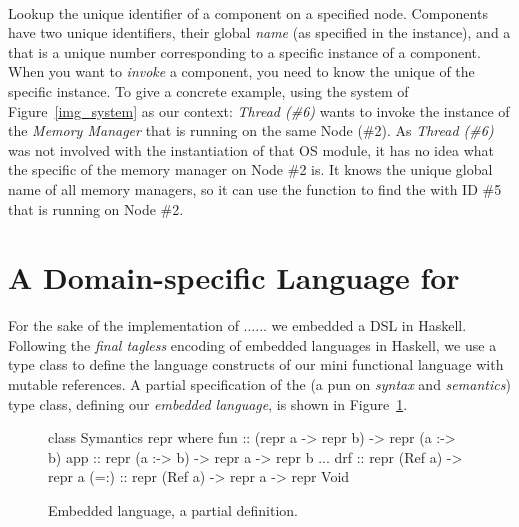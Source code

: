 \paragraph{}
Lookup the unique identifier of a component on a specified node.
Components have two unique identifiers, their global \emph{name} (as specified in the  instance), and a  that
is a unique number corresponding to a specific instance of a component.
When you want to \emph{invoke} a component, you need to know the unique  of the specific instance.
To give a concrete example, using the system of Figure~\ref{img_system} as our context: \emph{Thread (\#6)} wants to invoke the instance of the \emph{Memory Manager} that is running on the same Node (\#2).
As \emph{Thread (\#6)} was not involved with the instantiation of that OS module, it has no idea what the specific  of the memory manager on Node \#2 is.
It knows the unique global name of all memory managers, so it can use the  function to find the  with ID \#5 that is running on Node \#2.

\section{A Domain-specific Language for \soosim}
\label{sec:dsl}

For the sake of the implementation of ...... we embedded a DSL in Haskell. 
Following the \emph{final tagless} \cite{final_tagless_embedding} encoding of embedded languages in Haskell, we use a type class to define the language constructs of our mini functional language with mutable references.
A partial specification of the  (a pun on \emph{syntax} and \emph{semantics}) type class, defining our \emph{embedded language}, is shown in Figure~\ref{fig:embedded_language_interface}.

\begin{figure}
\centering
\begin{code}
class Symantics repr where
  fun  :: (repr a -> repr b) -> repr (a :-> b)
  app  :: repr (a :-> b) -> repr a -> repr b
  ...
  drf   :: repr (Ref a) -> repr a
  (=:)  :: repr (Ref a) -> repr a -> repr Void
\end{code}
\caption{Embedded language, a partial definition.}
\label{fig:embedded_language_interface}
\end{figure}


